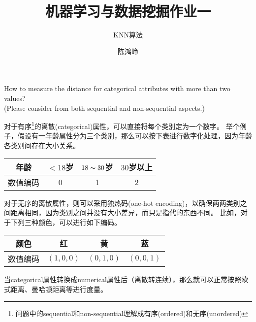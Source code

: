 \documentclass[logo,reportComp]{thesis}
\title{机器学习与数据挖掘作业一}
\subtitle{KNN算法}
\author{陈鸿峥}
\begin{document}
\maketitle

\begin{question}
\normalfont How to measure the distance for categorical attributes with more than two values?\\
(Please consider from both sequential and non-sequential aspects.) %
\end{question}
\begin{answer}
对于有序\footnote{问题中的sequential和non-sequential理解成有序(ordered)和无序(unordered)}的离散(categorical)属性，可以直接将每个类别定为一个数字。
举个例子，假设有一年龄属性分为三个类别，那么可以按下表进行数字化处理，因为年龄各类别间存在大小关系。
\begin{center}
\begin{tabular}{|c|c|c|c|}\hline
年龄 & $<18$岁 & $18\thicksim 30$岁 & $30$岁以上\\\hline
数值编码 & 0 & 1 & 2\\\hline
\end{tabular}
\end{center}

对于无序的离散属性，则可以采用独热码(one-hot encoding)，以确保两两类别之间距离相同，因为类别之间并没有大小差异，而只是指代的东西不同。
比如，对于下列三种颜色，可以进行如下编码。
\begin{center}
\begin{tabular}{|c|c|c|c|}\hline
颜色 & 红 & 黄 & 蓝\\\hline
数值编码 & $(1,0,0)$ & $(0,1,0)$ & $(0,0,1)$\\\hline
\end{tabular}
\end{center}

当categorical属性转换成numerical属性后（离散转连续），那么就可以正常按照欧式距离、曼哈顿距离等进行度量。
\end{answer}
\end{document}
